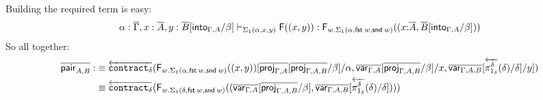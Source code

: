 \documentclass[10pt]{article}
\theoremstyle{definition}
\newcommand\dsd[1]{\ensuremath{\mathsf{#1}}}
\newcommand{\yields}{\vdash}
\newcommand{\app}[2]{\ensuremath{#1 \: #2}}
\newcommand{\telety}[3]{\ensuremath{(#1{:}#2,#3)}}
\newcommand{\fst}[1]{\app{\dsd{fst}}{#1}}
\newcommand{\snd}[1]{\app{\dsd{snd}}{#1}}
\newcommand{\rewrite}[2]{\overleftarrow{#1}(#2)}
\newcommand\F[2]{\ensuremath{\mathsf{F}_{#1}(#2)}}
\newcommand\FI[1]{\ensuremath{\mathsf{F}{(#1)}}}
\newcommand\FIs[2]{\ensuremath{\mathsf{F}_{#1}{(#2)}}}
\begin{document}
\begin{enumerate}[style = multiline, labelwidth = 80pt]
Building the required term is easy:
\begin{align*}
\alpha : \upstairs{\Gamma}, x : \upstairs{A}, y : \upstairs{B}[\into{\Gamma,A}/\beta] \yields_{\Sigma_1(\alpha, x, y)} \FI{(x, y)} : \F{w. \Sigma_1(\alpha,\fst w, \snd w)}{\telety{x}{\upstairs{A}}{\upstairs{B}[\into{\Gamma,A}/\beta]}}
\end{align*}
So all together:
\begin{align*}
\upstairs{\qpair{A,B}} :&\equiv \rewrite{\contract{\delta}}{\FIs{w. \Sigma_1(\alpha,\fst w, \snd w)}{(x, y)}[\upstairs{\proj{\Gamma, A}}[\upstairs{\proj{\Gamma, A, B}}/\beta]/\alpha, \upstairs{\qvar{\Gamma, A}}[\upstairs{\proj{\Gamma, A, B}}/\beta]/x, \upstairs{\qvar{\Gamma, A, B}}[\rewrite{\pi^\delta_{1_\delta}}{\delta}/\delta]/y]} \\
&\equiv \rewrite{\contract{\delta}}{\FIs{w. \Sigma_1(\delta,\fst w, \snd w)}{(\upstairs{\qvar{\Gamma, A}}[\upstairs{\proj{\Gamma, A, B}}/\beta], \upstairs{\qvar{\Gamma, A, B}}[\rewrite{\pi^\delta_{1_\delta}}{\delta}/\delta])}}
\end{align*}


\end{enumerate}
\end{document}
